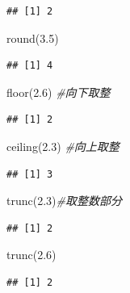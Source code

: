 \documentclass[
]{book}
\newenvironment{Shaded}{\begin{snugshade}}{\end{snugshade}}
\newcommand{\CommentTok}[1]{\textcolor[rgb]{0.56,0.35,0.01}{\textit{#1}}}
\newcommand{\FloatTok}[1]{\textcolor[rgb]{0.00,0.00,0.81}{#1}}
\newcommand{\FunctionTok}[1]{\textcolor[rgb]{0.00,0.00,0.00}{#1}}
\newcommand{\NormalTok}[1]{#1}
\begin{document}
\begin{verbatim}
## [1] 2
\end{verbatim}

\begin{Shaded}
\begin{Highlighting}[]
\FunctionTok{round}\NormalTok{(}\FloatTok{3.5}\NormalTok{)}
\end{Highlighting}
\end{Shaded}

\begin{verbatim}
## [1] 4
\end{verbatim}

\begin{Shaded}
\begin{Highlighting}[]
\FunctionTok{floor}\NormalTok{(}\FloatTok{2.6}\NormalTok{) }\CommentTok{\#向下取整}
\end{Highlighting}
\end{Shaded}

\begin{verbatim}
## [1] 2
\end{verbatim}

\begin{Shaded}
\begin{Highlighting}[]
\FunctionTok{ceiling}\NormalTok{(}\FloatTok{2.3}\NormalTok{) }\CommentTok{\#向上取整}
\end{Highlighting}
\end{Shaded}

\begin{verbatim}
## [1] 3
\end{verbatim}

\begin{Shaded}
\begin{Highlighting}[]
\FunctionTok{trunc}\NormalTok{(}\FloatTok{2.3}\NormalTok{)}\CommentTok{\#取整数部分}
\end{Highlighting}
\end{Shaded}

\begin{verbatim}
## [1] 2
\end{verbatim}

\begin{Shaded}
\begin{Highlighting}[]
\FunctionTok{trunc}\NormalTok{(}\FloatTok{2.6}\NormalTok{)}
\end{Highlighting}
\end{Shaded}

\begin{verbatim}
## [1] 2
\end{verbatim}
\end{document}
